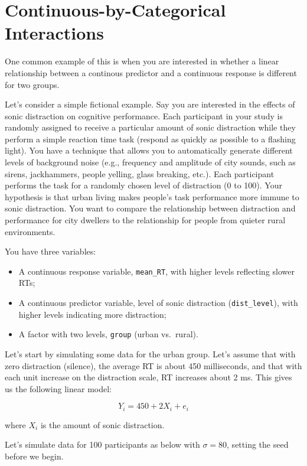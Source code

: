 \documentclass[]{book}
\providecommand{\tightlist}{%
  \setlength{\itemsep}{0pt}\setlength{\parskip}{0pt}}
\begin{document}
\hypertarget{cont-by-cat}{%
\section{Continuous-by-Categorical Interactions}\label{cont-by-cat}}

One common example of this is when you are interested in whether a linear relationship between a continous predictor and a continuous response is different for two groups.

Let's consider a simple fictional example. Say you are interested in the effects of sonic distraction on cognitive performance. Each participant in your study is randomly assigned to receive a particular amount of sonic distraction while they perform a simple reaction time task (respond as quickly as possible to a flashing light). You have a technique that allows you to automatically generate different levels of background noise (e.g., frequency and amplitude of city sounds, such as sirens, jackhammers, people yelling, glass breaking, etc.). Each participant performs the task for a randomly chosen level of distraction (0 to 100). Your hypothesis is that urban living makes people's task performance more immune to sonic distraction. You want to compare the relationship between distraction and performance for city dwellers to the relationship for people from quieter rural environments.

You have three variables:

\begin{itemize}
\tightlist
\item
  A continuous response variable, \texttt{mean\_RT}, with higher levels reflecting slower RTs;
\item
  A continuous predictor variable, level of sonic distraction (\texttt{dist\_level}), with higher levels indicating more distraction;
\item
  A factor with two levels, \texttt{group} (urban vs.~rural).
\end{itemize}

Let's start by simulating some data for the urban group. Let's assume that with zero distraction (silence), the average RT is about 450 milliseconds, and that with each unit increase on the distraction scale, RT increases about 2 ms. This gives us the following linear model:

\[Y_i = 450 + 2 X_i + e_i\]

where \(X_i\) is the amount of sonic distraction.

Let's simulate data for 100 participants as below with \(\sigma = 80\), setting the seed before we begin.
\end{document}
